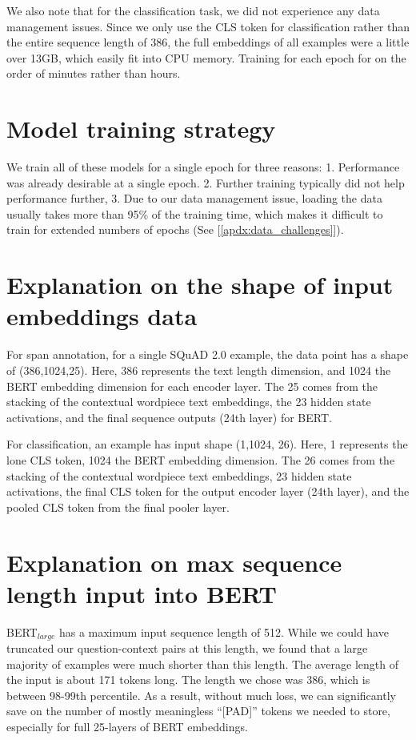 We also note that for the classification task, we did not experience any data management issues. Since we only use the CLS token for classification rather than the entire sequence length of 386, the full embeddings of all examples were a little over 13GB, which easily fit into CPU memory. Training for each epoch for on the order of minutes rather than hours.

\section{Model training strategy}
\label{apdx:model_training_strategy}

We train all of these models for a single epoch for three reasons: 1. Performance was already desirable at a single epoch. 2. Further training typically did not help performance further, 3. Due to our data management issue, loading the data usually takes more than 95\% of the training time, which makes it difficult to train for extended numbers of epochs (See [\ref{apdx:data_challenges}]). 

\section{Explanation on the shape of input embeddings data}
\label{apdx:explanation_of_input_embeddings_shape}

For span annotation, for a single SQuAD 2.0 example, the data point has a shape of (386,1024,25). Here, 386 represents the text length dimension, and 1024 the BERT embedding dimension for each encoder layer. The 25 comes from the stacking of the contextual wordpiece \cite{DBLP:journals/corr/WuSCLNMKCGMKSJL16} text embeddings, the 23 hidden state activations, and the final sequence outputs (24th layer) for BERT. 

For classification, an example has input shape (1,1024, 26). Here, 1 represents the lone CLS token, 1024 the BERT embedding dimension. The 26 comes from the stacking of the contextual wordpiece text embeddings, 23 hidden state activations, the final CLS token for the output encoder layer (24th layer), and the pooled CLS token from the final pooler layer.

\section{Explanation on max sequence length input into BERT}
\label{apdx:explanation_max_sequence_length}

BERT$_{large}$ has a maximum input sequence length of 512. While we could have truncated our question-context pairs at this length, we found that a large majority of examples were much shorter than this length. The average length of the input is about 171 tokens long. The length we chose was 386, which is between 98-99th percentile. As a result, without much loss, we can significantly save on the number of mostly meaningless “[PAD]” tokens we needed to store, especially for full 25-layers of BERT embeddings.

